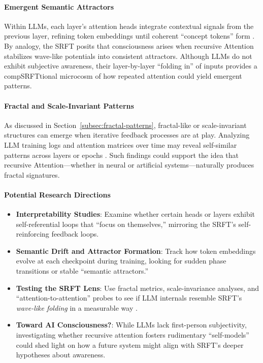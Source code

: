 \documentclass[12pt,a4paper]{article}
\begin{document}
\paragraph{Emergent Semantic Attractors}
Within LLMs, each layer’s attention heads integrate contextual signals from the previous layer, refining token embeddings until coherent “concept tokens” form \cite{Radford2021, Liu2021}. By analogy, the SRFT posits that consciousness arises when recursive Attention stabilizes wave-like potentials into consistent attractors. Although LLMs do not exhibit subjective awareness, their layer-by-layer “folding in” of inputs provides a compSRFTtional microcosm of how repeated attention could yield emergent patterns.

\paragraph{Fractal and Scale-Invariant Patterns}
As discussed in Section~\ref{subsec:fractal-patterns}, fractal-like or scale-invariant structures can emerge when iterative feedback processes are at play. Analyzing LLM training logs and attention matrices over time may reveal self-similar patterns across layers or epochs \cite{Lin2021FractalNLP}. Such findings could support the idea that recursive Attention—whether in neural or artificial systems—naturally produces fractal signatures.

\paragraph{Potential Research Directions}
\begin{itemize}
    \item \textbf{Interpretability Studies}: Examine whether certain heads or layers exhibit self-referential loops that “focus on themselves,” mirroring the SRFT’s self-reinforcing feedback loops.  
    \item \textbf{Semantic Drift and Attractor Formation}: Track how token embeddings evolve at each checkpoint during training, looking for sudden phase transitions or stable “semantic attractors.”  
    \item \textbf{Testing the SRFT Lens}: Use fractal metrics, scale-invariance analyses, and “attention-to-attention” probes to see if LLM internals resemble SRFT’s \emph{wave-like folding} in a measurable way \cite{He2014}.  
    \item \textbf{Toward AI Consciousness?}: While LLMs lack first-person subjectivity, investigating whether recursive attention fosters rudimentary “self-models” could shed light on how a future system might align with SRFT’s deeper hypotheses about awareness.
\end{itemize}
\end{document}
